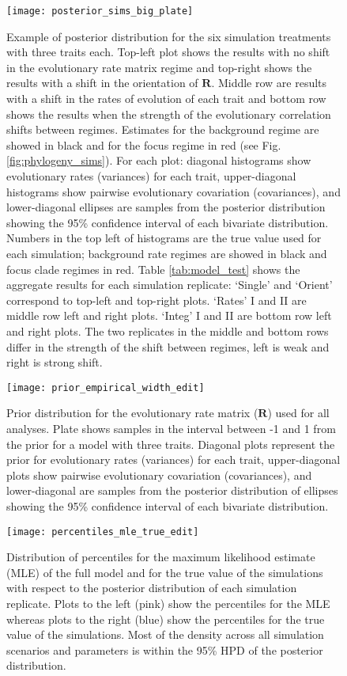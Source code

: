 \pagebreak

\begin{figure}[h]
	\centering
	\texttt{[image: posterior\_sims\_big\_plate]}
	\caption{Example of posterior distribution for the six simulation treatments with three traits each. Top-left plot shows the results with no shift in the evolutionary rate matrix regime and top-right shows the results with a shift in the orientation of $\mathbf{R}$. Middle row are results with a shift in the rates of evolution of each trait and bottom row shows the results when the strength of the evolutionary correlation shifts between regimes. Estimates for the background regime are showed in black and for the focus regime in red (see Fig. \ref{fig:phylogeny_sims}). For each plot: diagonal histograms show evolutionary rates (variances) for each trait, upper-diagonal histograms show pairwise evolutionary covariation (covariances), and lower-diagonal ellipses are samples from the posterior distribution showing the 95\% confidence interval of each bivariate distribution. Numbers in the top left of histograms are the true value used for each simulation; background rate regimes are showed in black and focus clade regimes in red. Table \ref{tab:model_test} shows the aggregate results for each simulation replicate: `Single' and `Orient' correspond to top-left and top-right plots. `Rates' I and II are middle row left and right plots. `Integ' I and II are bottom row left and right plots. The two replicates in the middle and bottom rows differ in the strength of the shift between regimes, left is weak and right is strong shift.}
	\label{fig:posterior_sims}
\end{figure}

\pagebreak

\begin{figure}[h]
	\centering
	\texttt{[image: prior\_empirical\_width\_edit]}
	\caption{Prior distribution for the evolutionary rate matrix ($\mathbf{R}$) used for all analyses. Plate shows samples in the interval between -1 and 1 from the prior for a model with three traits. Diagonal plots represent the prior for evolutionary rates (variances) for each trait, upper-diagonal plots show pairwise evolutionary covariation (covariances), and lower-diagonal are samples from the posterior distribution of ellipses showing the 95\% confidence interval of each bivariate distribution.}
	\label{fig:prior}
\end{figure}

\pagebreak

\begin{figure}[h]
	\centering
	\texttt{[image: percentiles\_mle\_true\_edit]}
	\caption{Distribution of percentiles for the maximum likelihood estimate (MLE) of the full model and for the true value of the simulations with respect to the posterior distribution of each simulation replicate. Plots to the left (pink) show the percentiles for the MLE whereas plots to the right (blue) show the percentiles for the true value of the simulations. Most of the density across all simulation scenarios and parameters is within the 95\% HPD of the posterior distribution.}
	\label{fig:quantiles}
\end{figure}

